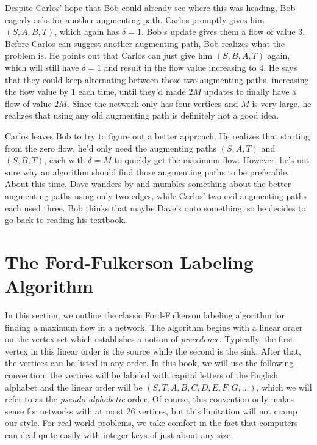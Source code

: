 Despite Carlos' hope that Bob could already see where this was
heading, Bob eagerly asks for another augmenting path. Carlos promptly
gives him $(S,A,B,T)$, which again has $\delta=1$. Bob's update gives
them a flow of value $3$. Before Carlos can suggest another augmenting
path, Bob realizes what the problem is. He points out that Carlos can
just give him $(S,B,A,T)$ again, which will still have $\delta=1$ and
result in the flow value increasing to $4$. He says that they could
keep alternating between those two augmenting paths, increasing the
flow value by $1$ each time, until they'd made $2M$ updates to finally
have a flow of value $2M$. Since the network only has four vertices
and $M$ is very large, he realizes that using any old augmenting path
is definitely not a good idea.

Carlos leaves Bob to try to figure out a better approach. He realizes
that starting from the zero flow, he'd only need the augmenting paths
$(S,A,T)$ and $(S,B,T)$, each with $\delta=M$ to quickly get the
maximum flow. However, he's not sure why an algorithm should find
those augmenting paths to be preferable. About this time, Dave wanders
by and mumbles something about the better augmenting paths using only
two edges, while Carlos' two evil augmenting paths each used
three. Bob thinks that maybe Dave's onto something, so he decides to
go back to reading his textbook.

\section{The Ford-Fulkerson Labeling Algorithm}\label{s:networkflow:labeling-algorithm}

In this section, we outline the classic Ford-Fulkerson labeling
algorithm for finding a maximum flow in a network.  The algorithm
begins with a linear order on the vertex set which establishes a
notion of \textit{precedence}.  Typically, the first vertex in this
linear order is the source while the second is the sink.  After that,
the vertices can be listed in any order.  In this book, we will use
the following convention: the vertices will be labeled with capital
letters of the English alphabet and the linear order will be
$(S,T,A,B,C,D,E,F,G,\dots)$, which we will refer to as the
\textit{pseudo-alphabetic} order.  Of course, this convention only
makes sense for networks with at most $26$ vertices, but this
limitation will not cramp our style.  For real world problems, we take
comfort in the fact that computers can deal quite easily with integer
keys of just about any size.

